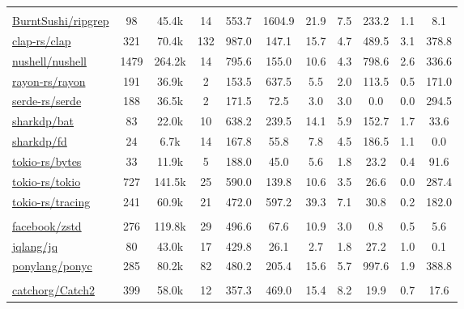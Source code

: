 \documentclass[11pt, a4paper, logo, copyright, nonumbering]{seed}
\begin{document}
\begin{table}[!ht]
{\begin{tabular}{lcc|c|c|ccc|ccc}
    \hline
    \rowcolor{mygray} \multicolumn{11}{c}{Rust} \\
\href{https://github.com/BurntSushi/ripgrep}{BurntSushi/ripgrep} & 98 & 45.4k & 14 & 553.7 & 1604.9 & 21.9 & 7.5 & 233.2 & 1.1 & 8.1 \\ 
\href{https://github.com/clap-rs/clap}{clap-rs/clap} & 321 & 70.4k & 132 & 987.0 & 147.1 & 15.7 & 4.7 & 489.5 & 3.1 & 378.8 \\ 
\href{https://github.com/nushell/nushell}{nushell/nushell} & 1479 & 264.2k & 14 & 795.6 & 155.0 & 10.6 & 4.3 & 798.6 & 2.6 & 336.6 \\ 
\href{https://github.com/rayon-rs/rayon}{rayon-rs/rayon} & 191 & 36.9k & 2 & 153.5 & 637.5 & 5.5 & 2.0 & 113.5 & 0.5 & 171.0 \\ 
\href{https://github.com/serde-rs/serde}{serde-rs/serde} & 188 & 36.5k & 2 & 171.5 & 72.5 & 3.0 & 3.0 & 0.0 & 0.0 & 294.5 \\ 
\href{https://github.com/sharkdp/bat}{sharkdp/bat} & 83 & 22.0k & 10 & 638.2 & 239.5 & 14.1 & 5.9 & 152.7 & 1.7 & 33.6 \\ 
\href{https://github.com/sharkdp/fd}{sharkdp/fd} & 24 & 6.7k & 14 & 167.8 & 55.8 & 7.8 & 4.5 & 186.5 & 1.1 & 0.0 \\ 
\href{https://github.com/tokio-rs/bytes}{tokio-rs/bytes} & 33 & 11.9k & 5 & 188.0 & 45.0 & 5.6 & 1.8 & 23.2 & 0.4 & 91.6 \\ 
\href{https://github.com/tokio-rs/tokio}{tokio-rs/tokio} & 727 & 141.5k & 25 & 590.0 & 139.8 & 10.6 & 3.5 & 26.6 & 0.0 & 287.4 \\ 
\href{https://github.com/tokio-rs/tracing}{tokio-rs/tracing} & 241 & 60.9k & 21 & 472.0 & 597.2 & 39.3 & 7.1 & 30.8 & 0.2 & 182.0 \\ 
\hline
    \rowcolor{mygray} \multicolumn{11}{c}{C} \\
\href{https://github.com/facebook/zstd}{facebook/zstd} & 276 & 119.8k & 29 & 496.6 & 67.6 & 10.9 & 3.0 & 0.8 & 0.5 & 5.6 \\ 
\href{https://github.com/jqlang/jq}{jqlang/jq} & 80 & 43.0k & 17 & 429.8 & 26.1 & 2.7 & 1.8 & 27.2 & 1.0 & 0.1 \\ 
\href{https://github.com/ponylang/ponyc}{ponylang/ponyc} & 285 & 80.2k & 82 & 480.2 & 205.4 & 15.6 & 5.7 & 997.6 & 1.9 & 388.8 \\ 
    \hline
    \rowcolor{mygray} \multicolumn{11}{c}{C++} \\
\href{https://github.com/catchorg/Catch2}{catchorg/Catch2} & 399 & 58.0k & 12 & 357.3 & 469.0 & 15.4 & 8.2 & 19.9 & 0.7 & 17.6 \\ 

\end{tabular}}
\end{table}
\end{document}
